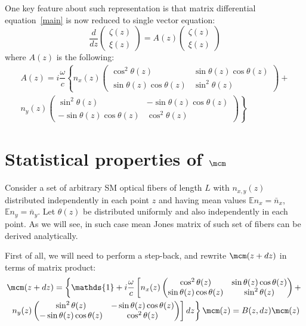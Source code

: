 \documentclass[12pt, notitlepage]{report}
\begin{document}
One key feature about such representation is that matrix differential equation~\eqref{main} is now reduced to single vector equation:
\begin{equation}
	\label{mainvec}
	\dfrac{d}{dz} \begin{pmatrix}
		\zeta(z) \\
		\xi(z)
	\end{pmatrix} = A(z) \begin{pmatrix}
	\zeta(z) \\
	\xi(z)
\end{pmatrix}
\end{equation}
where $A(z)$ is the following:
\begin{multline*}
	A(z) = i\dfrac{\omega}{c}\left\{n_x(z)\begin{pmatrix}
		\cos^2\theta(z) & \sin\theta(z)\cos\theta(z) \\
		\sin\theta(z)\cos\theta(z) & \sin^2\theta(z)
	\end{pmatrix} + \right. \\ \left.
	n_y(z)\begin{pmatrix}
		\sin^2\theta(z) & -\sin\theta(z)\cos\theta(z) \\
		-\sin\theta(z)\cos\theta(z) & \cos^2\theta(z)
	\end{pmatrix}
	\right\}
\end{multline*}


\section{Statistical properties of $\mcm$}
Consider a set of arbitrary SM optical fibers of length $L$ with $n_{x,y}(z)$ distributed independently in each point $z$ and having mean values $\mathbb{E}n_x = \bar{n}_x$, $\mathbb{E}n_y = \bar{n}_y$. Let $\theta(z)$ be distributed uniformly and also independently in each point. As we will see, in such case mean Jones matrix of such set of fibers can be derived analytically.

First of all, we will need to perform a step-back, and rewrite $\mcm(z+dz)$ in terms of matrix product:
\begin{multline*}
	\mcm(z+ dz) = \left\{\mathds{1} + i\dfrac{\omega}{c}\left[n_x(z)
	\begin{pmatrix}
		\cos^2\theta(z) & \sin\theta(z)\cos\theta(z) \\
		\sin\theta(z)\cos\theta(z) & \sin^2\theta(z)
	\end{pmatrix} + \right.\right.\\ \left.\left.
	n_y(z) 
	\begin{pmatrix}
		\sin^2\theta(z) & -\sin\theta(z)\cos\theta(z) \\
		-\sin\theta(z)\cos\theta(z) & \cos^2\theta(z)
	\end{pmatrix}
	\right]dz\right\}\mcm(z) = B(z,dz)\mcm(z)
\end{multline*}
\end{document}
